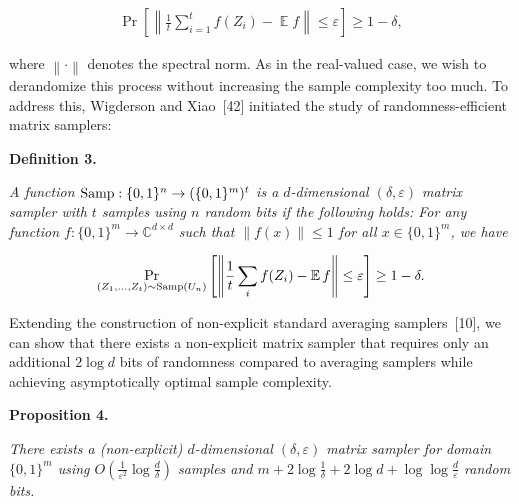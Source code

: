 \[\begin{gathered}
\Pr\left[\left\lVert\frac{1}{t}\sum_{i=1}^{t}f(Z_{i})-\operatorname*{\mathbb{E}}f\right\rVert\leq\varepsilon\right]\geq 1-\delta,
\end{gathered}\]


where $\left\lVert\cdot\right\rVert$ denotes the spectral norm.
As in the real-valued case, we wish to derandomize this process without increasing the sample complexity too much.
To address this, Wigderson and Xiao [42] initiated the study of randomness-efficient matrix samplers:\par





\par\medskip\noindent\textbf{
\textbf{Definition 3}\textbf{.}
}\par



\emph{A function $\textup{{Samp}}:\{0,1\}^{n}\to(\{0,1\}^{m})^{t}$ is a $d$-dimensional $(\delta,\varepsilon)$ matrix sampler with $t$ samples using $n$ random bits if the following holds: For any function $f:\{0,1\}^{m}\to\mathbb{C}^{d\times d}$ such that $\|f(x)\|\leq 1$ for all $x\in\{0,1\}^{m}$, we have}\par


\[\begin{gathered}
\Pr_{(Z_{1},\dots,Z_{t})\sim\textup{{Samp}}(U_{n})}\left[\left\lVert\frac{1}{t}\sum_{i}f(Z_{i})-\operatorname*{\mathbb{E}}f\right\rVert\leq\varepsilon\right]\geq 1-\delta.
\end{gathered}\]






Extending the construction of non-explicit standard averaging samplers [10], we can show that there exists a non-explicit matrix sampler that requires only an additional $2\log d$ bits of randomness compared to averaging samplers while achieving asymptotically optimal sample complexity.\par





\par\medskip\noindent\textbf{
\textbf{Proposition 4}\textbf{.}
}\par



\emph{There exists a (non-explicit) $d$-dimensional $(\delta,\varepsilon)$ matrix sampler for domain $\{0,1\}^{m}$ using $O(\frac{1}{\varepsilon^{2}}\log\frac{d}{\delta})$ samples and $m+2\log\frac{1}{\delta}+2\log d+\log\log\frac{d}{\varepsilon}$ random bits.}\par



